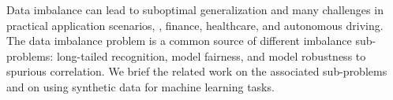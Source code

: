 


Data imbalance can lead to
suboptimal generalization and many challenges
in practical application scenarios, \eg, finance, healthcare, and autonomous driving.
The data imbalance problem is a common source of different imbalance sub-problems: long-tailed recognition, model fairness, and model robustness to spurious correlation.
We brief the related work on the associated sub-problems and on using synthetic data for machine learning tasks.






